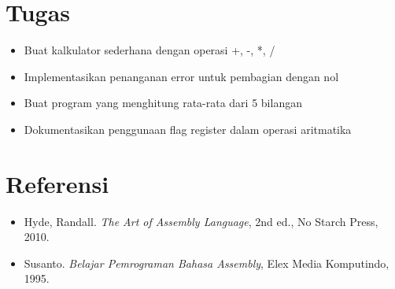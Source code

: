 \section{Tugas}
\begin{itemize}
\item Buat kalkulator sederhana dengan operasi +, -, *, /
\item Implementasikan penanganan error untuk pembagian dengan nol
\item Buat program yang menghitung rata-rata dari 5 bilangan
\item Dokumentasikan penggunaan flag register dalam operasi aritmatika
\end{itemize}

\section{Referensi}
\begin{itemize}
\item Hyde, Randall. \textit{The Art of Assembly Language}, 2nd ed., No Starch Press, 2010.
\item Susanto. \textit{Belajar Pemrograman Bahasa Assembly}, Elex Media Komputindo, 1995.
\end{itemize}


